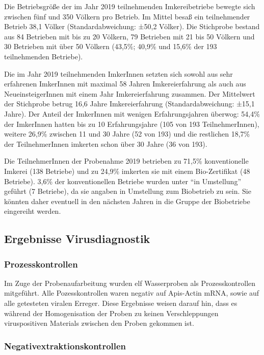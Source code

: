 Die Betriebsgröße der im Jahr 2019 teilnehmenden Imkereibetriebe bewegte sich zwischen fünf und 350 Völkern pro Betrieb. Im Mittel besaß ein teilnehmender Betrieb 38,1 Völker (Standardabweichung: ±50,2 Völker). Die Stichprobe bestand aus 84 Betrieben mit bis zu 20 Völkern, 79 Betrieben mit 21 bis 50 Völkern und 30 Betrieben mit über 50 Völkern (43,5\%; 40,9\% und 15,6\% der 193 teilnehmenden Betriebe).

Die im Jahr 2019 teilnehmenden ImkerInnen setzten sich sowohl aus sehr erfahrenen ImkerInnen mit maximal 58 Jahren Imkereierfahrung als auch aus NeueinsteigerInnen mit einem Jahr Imkereierfahrung zusammen. Der Mittelwert der Stichprobe betrug 16,6 Jahre Imkereierfahrung (Standardabweichung: ±15,1 Jahre). Der Anteil der ImkerInnen mit wenigen Erfahrungsjahren überwog: 54,4\% der ImkerInnen hatten bis zu 10 Erfahrungsjahre (105 von 193 TeilnehmerInnen), weitere 26,9\% zwischen 11 und 30 Jahre (52 von 193) und die restlichen 18,7\% der TeilnehmerInnen imkerten schon über 30 Jahre (36 von 193). 

Die TeilnehmerInnen der Probenahme 2019 betrieben zu 71,5\% konventionelle Imkerei (138 Betriebe) und zu 24,9\% imkerten sie mit einem Bio-Zertifikat (48 Betriebe). 3,6\% der konventionellen Betriebe wurden unter \enquote{in Umstellung} geführt (7 Betriebe), da sie angaben in Umstellung zum Biobetrieb zu sein. Sie könnten daher eventuell in den nächsten Jahren in die Gruppe der Biobetriebe eingereiht werden.

\subsection{Ergebnisse Virusdiagnostik}

\subsubsection{Prozesskontrollen}
\label{chap:prozesskontrollen}

Im Zuge der Probenaufarbeitung wurden elf Wasserproben als Prozesskontrollen mitgeführt. Alle Pozesskontrollen waren negativ auf Apis-Actin mRNA, sowie auf alle getesteten viralen Erreger. Diese Ergebnisse weisen darauf hin, dass es während der Homogenisation der Proben zu keinen Verschleppungen viruspositiven Materials zwischen den Proben gekommen ist.

\subsubsection{Negativextraktionskontrollen}
\label{chap:negativkontrollen}


